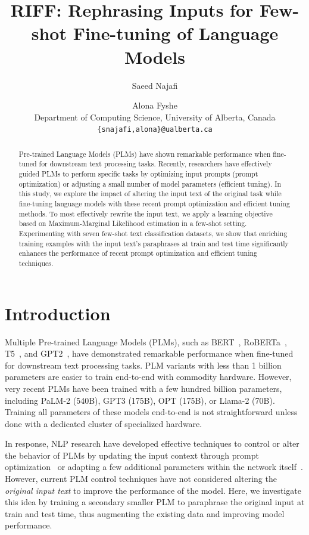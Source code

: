 \documentclass[11pt]{article}
\title{RIFF: Rephrasing Inputs for Few-shot Fine-tuning of Language Models}
\author{Saeed Najafi \and
  Alona Fyshe \\
  Department of Computing Science, University of Alberta, Canada\\
  \texttt{\{snajafi,alona\}@ualberta.ca} \\}
\begin{document}
\maketitle
\begin{abstract}
Pre-trained Language Models (PLMs) have shown remarkable performance when fine-tuned for downstream text processing tasks. Recently, researchers have effectively guided PLMs to perform specific tasks by optimizing input prompts (prompt optimization) or adjusting a small number of model parameters (efficient tuning). In this study, we explore the impact of altering the input text of the original task while fine-tuning language models with these recent prompt optimization and efficient tuning methods. To most effectively rewrite the input text, we apply a learning objective based on Maximum-Marginal Likelihood estimation in a few-shot setting. Experimenting with seven few-shot text classification datasets, we show that enriching training examples with the input text's paraphrases at train and test time significantly enhances the performance of recent prompt optimization and efficient tuning techniques.
\end{abstract}


\section{Introduction}
Multiple Pre-trained Language Models (PLMs), such as BERT~\cite{devlin-etal-2019-bert}, RoBERTa~\cite{DBLP:journals/corr/abs-1907-11692}, T5~\cite{DBLP:journals/corr/abs-1910-10683}, and GPT2~\cite{radford2019language}, have demonstrated remarkable performance when fine-tuned for downstream text processing tasks. PLM variants with less than 1 billion parameters are easier to train end-to-end with commodity hardware. However, very recent PLMs have been trained with a few hundred billion parameters, including PaLM-2 (540B)\cite{anil2023palm}, GPT3 (175B)\cite{brown2020language}, OPT (175B)\cite{zhang2022opt}, or Llama-2 (70B)\cite{touvron2023llama}. Training all parameters of these models end-to-end is not straightforward unless done with a dedicated cluster of specialized hardware.

In response, NLP research have developed effective techniques to control or alter the behavior of PLMs by updating the input context through prompt optimization~\cite{DBLP:journals/corr/abs-2107-13586} or adapting a few additional parameters within the network itself~\cite{DBLP:journals/corr/abs-2106-09685}.
However, current PLM control techniques have not considered altering the \textit{original input text} to improve the performance of the model.  Here, we investigate this idea by training a secondary smaller PLM to paraphrase the original input at train and test time, thus augmenting the existing data and improving model performance.
\end{document}

